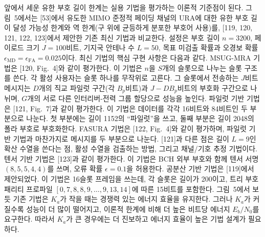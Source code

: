 앞에서 세운 유한 부호 길이 한계는 실용 기법을 평가하는 이론적 기준점이 된다. 그림~5에서는 [53]에서 유도한 MIMO 준정적 페이딩 채널의 URA에 대한 유한 부호 길이 달성 가능성 한계와 역 한계(구 위에 균등하게 분포한 부호어 사용)를, [119, 120, 121, 122, 123]에서 제안한 기존 최신 기법과 비교한다. 설정은 부호 길이 $n=3200$, 페이로드 크기 $J=100$비트, 기지국 안테나 수 $L=50$, 목표 미검출 확률과 오경보 확률 $\epsilon_{\mathrm{MD}}=\epsilon_{\mathrm{FA}}=0.025$이다. 최신 기법의 핵심 구현 사항은 다음과 같다. MSUG-MRA 기법은 [120, Fig.~4]와 같이 평가한다. 이 기법은 $n$을 $S$개의 슬롯으로 나누는 슬롯 구조를 쓴다. 각 활성 사용자는 슬롯 하나를 무작위로 고른다. 그 슬롯에서 전송하는 $J$비트 메시지는 $D$개의 직교 파일럿 구간(각 $B_p$비트)과 $J-DB_p$비트의 부호화 구간으로 나뉘며, $G$개의 서로 다른 인터리버-전력 그룹 할당으로 성능을 높인다. 파일럿 기반 기법은 [121, Fig.~7]과 같이 평가한다. 이 기법은 데이터를 각각 16비트와 84비트인 두 부분으로 나눈다. 첫 부분에는 길이 1152의 ``파일럿''을 쓰고, 둘째 부분은 길이 2048의 폴라 부호로 부호화한다. FASURA 기법은 [122, Fig.~4]와 같이 평가하며, 파일럿 기반 기법과 마찬가지로 메시지를 두 부분으로 나눈다. [121]과 다른 점은 길이 $L=9$인 확산 수열을 쓴다는 점, 활성 수열을 검출하는 방법, 그리고 채널/기호 추정 기법이다. 텐서 기반 기법은 [123]과 같이 평가한다. 이 기법은 BCH 외부 부호와 함께 텐서 서명 $(8,5,5,4,4)$를 쓰며, 오류 확률 $\epsilon=0.1$을 허용한다. 공분산 기반 기법은 [119]에서 제안되었다. 이 기법은 16슬롯 프레임을 쓰는데, 각 슬롯은 길이가 200이고, 트리 부호 패리티 프로파일 $[0,7,8,8,9,\dots,9,13,14]$에 따른 15비트를 포함한다. 그림~5에서 보듯 기존 기법은 $K_a$가 작을 때는 경쟁력 있는 에너지 효율을 유지한다. 그러나 $K_a$가 커질수록 성능이 더 많이 떨어지고, 이론적 한계에 비해 더 높은 비트당 에너지 $E_b/N_0$를 요구한다. 따라서 $K_a$가 큰 경우에는 더 진보하고 에너지 효율이 높은 기법 설계가 필요하다.
